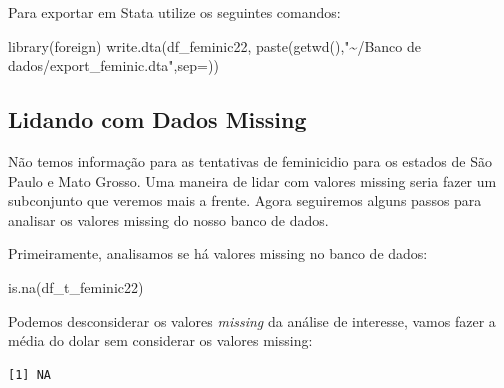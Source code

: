 \documentclass[
  letterpaper,
  DIV=11,
  numbers=noendperiod]{scrreprt}
\newenvironment{Shaded}{\begin{snugshade}}{\end{snugshade}}
\newcommand{\AttributeTok}[1]{\textcolor[rgb]{0.40,0.45,0.13}{#1}}
\newcommand{\ConstantTok}[1]{\textcolor[rgb]{0.56,0.35,0.01}{#1}}
\newcommand{\FunctionTok}[1]{\textcolor[rgb]{0.28,0.35,0.67}{#1}}
\newcommand{\NormalTok}[1]{\textcolor[rgb]{0.00,0.23,0.31}{#1}}
\newcommand{\SpecialCharTok}[1]{\textcolor[rgb]{0.37,0.37,0.37}{#1}}
\newcommand{\StringTok}[1]{\textcolor[rgb]{0.13,0.47,0.30}{#1}}
\begin{document}
Para exportar em Stata utilize os seguintes comandos:

\begin{Shaded}
\begin{Highlighting}[]
\FunctionTok{library}\NormalTok{(foreign)}
\FunctionTok{write.dta}\NormalTok{(df\_feminic22, }\FunctionTok{paste}\NormalTok{(}\FunctionTok{getwd}\NormalTok{(),}\StringTok{"\textasciitilde{}/Banco de dados/export\_feminic.dta"}\NormalTok{,}\AttributeTok{sep=}\StringTok{\textquotesingle{}\textquotesingle{}}\NormalTok{))}
\end{Highlighting}
\end{Shaded}

\subsection{Lidando com Dados Missing}\label{lidando-com-dados-missing}

Não temos informação para as tentativas de feminicidio para os estados
de São Paulo e Mato Grosso. Uma maneira de lidar com valores missing
seria fazer um subconjunto que veremos mais a frente. Agora seguiremos
alguns passos para analisar os valores missing do nosso banco de dados.

Primeiramente, analisamos se há valores missing no banco de dados:

\begin{Shaded}
\begin{Highlighting}[]
\FunctionTok{is.na}\NormalTok{(df\_t\_feminic22)}
\end{Highlighting}
\end{Shaded}

Podemos desconsiderar os valores \emph{missing} da análise de interesse,
vamos fazer a média do dolar sem considerar os valores missing:

\begin{Shaded}
\end{Shaded}

\begin{verbatim}
[1] NA
\end{verbatim}

\begin{Shaded}
\end{Shaded}
\end{document}
